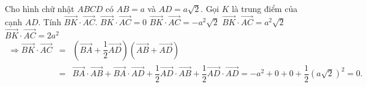\begin{ex}%
Cho hình chữ nhật $ABCD$ có $AB=a$ và $AD=a\sqrt{2}$. Gọi $K$ là trung điểm của cạnh $AD$. Tính $\overrightarrow{BK}\cdot\overrightarrow{AC}$.
\choice
{\True $\overrightarrow{BK}\cdot\overrightarrow{AC}=0$}
{$\overrightarrow{BK}\cdot\overrightarrow{AC}=-a^2\sqrt{2}$}
{$\overrightarrow{BK}\cdot\overrightarrow{AC}=a^2\sqrt{2}$}
{$\overrightarrow{BK}\cdot\overrightarrow{AC}=2a^2$}
\loigiai
{	
\noindent \begin{eqnarray*}
\Rightarrow\overrightarrow{BK}\cdot\overrightarrow{AC}&=&\left(\overrightarrow{BA}+\dfrac{1}{2}\overrightarrow{AD} \right)(\overrightarrow{AB}+\overrightarrow{AD} )\\
&=&\overrightarrow{BA}\cdot\overrightarrow{AB}+\overrightarrow{BA}\cdot\overrightarrow{AD}+\dfrac{1}{2}\overrightarrow{AD}\cdot\overrightarrow{AB}+\dfrac{1}{2}\overrightarrow{AD}\cdot\overrightarrow{AD}=-a^2+0+0+\dfrac{1}{2}{{(a\sqrt{2} )}^2}=0.
\end{eqnarray*}}
\end{ex}

